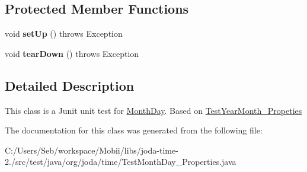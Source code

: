 \subsection*{Protected Member Functions}
\begin{DoxyCompactItemize}
\item 
\hypertarget{classorg_1_1joda_1_1time_1_1_test_month_day___properties_a2b5079db140724e8931ddc50fadfd2e6}{void {\bfseries set\-Up} ()  throws Exception }\label{classorg_1_1joda_1_1time_1_1_test_month_day___properties_a2b5079db140724e8931ddc50fadfd2e6}

\item 
\hypertarget{classorg_1_1joda_1_1time_1_1_test_month_day___properties_aa2ab8806100454dd0fcbfd4244642468}{void {\bfseries tear\-Down} ()  throws Exception }\label{classorg_1_1joda_1_1time_1_1_test_month_day___properties_aa2ab8806100454dd0fcbfd4244642468}

\end{DoxyCompactItemize}


\subsection{Detailed Description}
This class is a Junit unit test for \hyperlink{classorg_1_1joda_1_1time_1_1_month_day}{Month\-Day}. Based on \hyperlink{}{Test\-Year\-Month\-\_\-\-Propeties} 

The documentation for this class was generated from the following file\-:\begin{DoxyCompactItemize}
\item 
C\-:/\-Users/\-Seb/workspace/\-Mobii/libs/joda-\/time-\/2./src/test/java/org/joda/time/Test\-Month\-Day\-\_\-\-Properties.\-java\end{DoxyCompactItemize}
